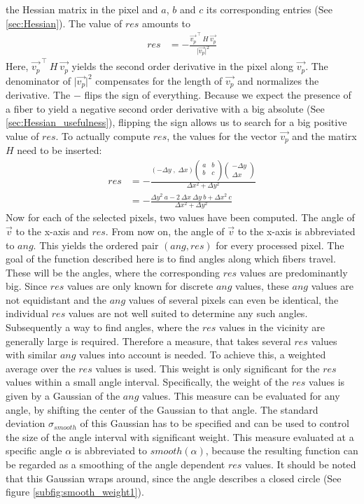 \documentclass[12pt,english,twocolumn]{revtex4}
\begin{document}
the Hessian matrix in the pixel and $a$, $b$ and $c$ its corresponding entries (See \ref{sec:Hessian}).
The value of $res$ amounts to
\begin{align*}
	res &= -\frac{\vec{v_p}^{\,\intercal} \ H \ \vec{v_p}}{\lvert \vec{v_p}\rvert ^2}
\end{align*}
Here, $\vec{v_p}^{\,\intercal} \ H \ \vec{v_p}$ yields the second order derivative in the pixel along $\vec{v_p}$. The denominator of $\lvert \vec{v_p}\rvert ^2$ compensates for the length of $\vec{v_p}$ and normalizes the derivative. The $-$ flips the sign of everything. Because we expect the presence of a fiber to yield a negative second order derivative with a big absolute (See \ref{sec:Hessian_usefulness}), flipping the sign allows us to search for a big positive value of $res$. To actually compute $res$, the values for the vector $\vec{v_p}$ and the matirx $H$ need to be inserted:
\begin{align*}
	res &= - \frac{
	\left(-\Delta y \; , \; \Delta x \right)
	\left(
	\begin{array}{rr}
    		a & b \\
	    b & c \\
	\end{array}
	\right)
	 \left(\begin{array}{r} -\Delta y \\ \Delta x \end{array} \right)
	 }{\Delta x ^2 + \Delta y ^2}\\
	& = - \frac{ \Delta y^2 \ a - 2 \ \Delta x \ \Delta y \ b + \Delta x ^2 \ c }{\Delta x ^2 + \Delta y ^2}
\end{align*}
Now for each of the selected pixels, two values have been computed. The angle of $\vec{v}$ to the x-axis and $res$. From now on, the angle of $\vec{v}$ to the x-axis is abbreviated to $ang$. This yields the ordered pair $(ang,res)$ for every processed pixel. The goal of the function described here is to find angles along which fibers travel. These will be the angles, where the corresponding $res$ values are predominantly big. Since $res$ values are only known for discrete $ang$ values, these $ang$ values are not equidistant and the $ang$ values of several pixels can even be identical, the individual $res$ values are not well suited to determine any such angles. Subsequently a way to find angles, where the $res$ values in the vicinity are generally large is required. Therefore a measure, that takes several $res$ values with similar $ang$ values into account is needed. To achieve this, a weighted average over the $res$ values is used. This weight is only significant for the $res$ values within a small angle interval. Specifically, the weight of the $res$ values is given by a Gaussian of the $ang$ values. This measure can be evaluated for any angle, by shifting the center of the Gaussian to that angle. The standard deviation $\sigma_{smooth}$ of this Gaussian has to be specified and can be used to control the size of the angle interval with significant weight. This measure evaluated at a specific angle $\alpha$ is abbreviated to $smooth(\alpha)$, because the resulting function can be regarded as a smoothing of the angle dependent $res$ values. It should be noted that this Gaussian wraps around, since the angle describes a closed circle (See figure \ref{subfig:smooth_weight1}).
\end{document}
